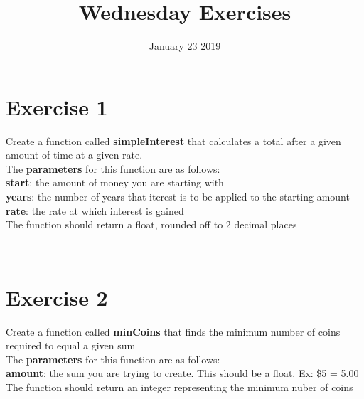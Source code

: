 \documentclass{memoir}
\begin{document}
\title{Wednesday Exercises}
\date{January 23 2019}
\maketitle

\section*{\Huge{Exercise 1}}
\begin{Large}
Create a function called \textbf{simpleInterest} that calculates a total after a
given amount of time at a given rate. \\
The \textbf{parameters} for this function are as follows: \\
\textbf{start}: the amount of money you are starting with \\
\textbf{years}: the number of years that iterest is to be applied to the
starting amount
\\
\textbf{rate}: the rate at which interest is gained \\
The function should return a float, rounded off to 2 decimal places
\end{Large}
\\

\section*{\Huge{Exercise 2}}
\begin{Large}
Create a function called \textbf{minCoins} that finds the minimum number of coins required to equal a given sum\\
The \textbf{parameters} for this function are as follows:
\\
\textbf{amount}: the sum you are trying to create. This should be a float. Ex: \$5 = 5.00
\\
The function should return an integer representing the minimum nuber of coins
\end{Large}
\end{document}
